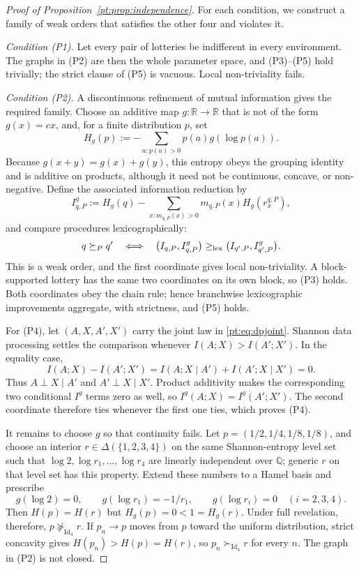 \documentclass[11pt,a4paper]{article}
\theoremstyle{definition}
\newcommand{\Sh}{H}
\newcommand{\Id}{\operatorname{Id}}
\newcommand{\R}{\mathbb R}
\newcommand{\1}{\mathbf 1}
\begin{document}
\begin{proof}[Proof of Proposition~\ref{pt:prop:independence}]
For each condition, we construct a family of weak orders that satisfies the other four and violates it.

\emph{Condition \textup{(P1)}.}  Let every pair of lotteries be indifferent in every environment.  The graphs in
\textup{(P2)} are then the whole parameter space, and \textup{(P3)}--\textup{(P5)} hold trivially; the strict clause of
\textup{(P5)} is vacuous.  Local non-triviality fails.

\emph{Condition \textup{(P2)}.}  A discontinuous refinement of mutual information gives the required family.  Choose an
additive map $g:\R\to\R$ that is not of the form $g(x)=cx$, and, for a finite distribution $p$, set
\[
H_g(p):=-\sum_{a:p(a)>0}p(a)g(\log p(a)).
\]
Because $g(x+y)=g(x)+g(y)$, this entropy obeys the grouping identity and is additive on products, although it need not
be continuous, concave, or non-negative.  Define the associated information reduction by
\[
I^g_{q,P}:=H_g(q)-\sum_{x:m_{q,P}(x)>0}m_{q,P}(x)H_g(r_x^{q,P}),
\]
and compare procedures lexicographically:
\[
q\succeq_Pq'
\quad\Longleftrightarrow\quad
\bigl(I_{q,P},I^g_{q,P}\bigr)
\ge_{\rm lex}
\bigl(I_{q',P},I^g_{q',P}\bigr).
\]
This is a weak order, and the first coordinate gives local non-triviality.  A block-supported lottery has the same two
coordinates on its own block, so \textup{(P3)} holds.  Both coordinates obey the chain rule; hence branchwise
lexicographic improvements aggregate, with strictness, and \textup{(P5)} holds.

For \textup{(P4)}, let $(A,X,A',X')$ carry the joint law in \eqref{pt:eq:dpjoint}.  Shannon data processing settles the
comparison whenever $I(A;X)>I(A';X')$.  In the equality case,
\[
I(A;X)-I(A';X')=I(A;X\mid A')+I(A';X\mid X')=0.
\]
Thus $A\perp X\mid A'$ and $A'\perp X\mid X'$.  Product additivity makes the corresponding two conditional
$I^g$ terms zero as well, so $I^g(A;X)=I^g(A';X')$.  The second coordinate therefore ties whenever the first one ties,
which proves \textup{(P4)}.

It remains to choose $g$ so that continuity fails.  Let
$p=(1/2,1/4,1/8,1/8)$, and choose an interior $r\in\Delta(\{1,2,3,4\})$ on the same Shannon-entropy level set such that
$\log2,\log r_1,\ldots,\log r_4$ are linearly independent over $\mathbb Q$; generic $r$ on that level set has this property.
Extend these numbers to a Hamel basis and prescribe
\[
g(\log2)=0,
\qquad
g(\log r_1)=-1/r_1,
\qquad
g(\log r_i)=0\quad(i=2,3,4).
\]
Then $\Sh(p)=\Sh(r)$ but $H_g(p)=0<1=H_g(r)$.  Under full revelation, therefore, $p\not\succeq_{\Id_4}r$.
If $p_n\to p$ moves from $p$ toward the uniform distribution, strict concavity gives
$\Sh(p_n)>\Sh(p)=\Sh(r)$, so $p_n\succ_{\Id_4}r$ for every $n$.  The graph in \textup{(P2)} is not closed.


\end{proof}
\end{document}
